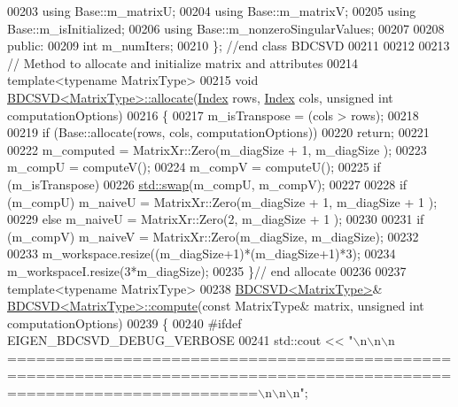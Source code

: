 \begin{DoxyCode}
00203   \textcolor{keyword}{using} Base::m\_matrixU;
00204   \textcolor{keyword}{using} Base::m\_matrixV;
00205   \textcolor{keyword}{using} Base::m\_isInitialized;
00206   \textcolor{keyword}{using} Base::m\_nonzeroSingularValues;
00207 
00208 \textcolor{keyword}{public}:  
00209   \textcolor{keywordtype}{int} m\_numIters;
00210 \}; \textcolor{comment}{//end class BDCSVD}
00211 
00212 
00213 \textcolor{comment}{// Method to allocate and initialize matrix and attributes}
00214 \textcolor{keyword}{template}<\textcolor{keyword}{typename} MatrixType>
00215 \textcolor{keywordtype}{void} \hyperlink{group___s_v_d___module_class_eigen_1_1_b_d_c_s_v_d}{BDCSVD<MatrixType>::allocate}(\hyperlink{namespace_eigen_a62e77e0933482dafde8fe197d9a2cfde}{Index} rows, 
      \hyperlink{namespace_eigen_a62e77e0933482dafde8fe197d9a2cfde}{Index} cols, \textcolor{keywordtype}{unsigned} \textcolor{keywordtype}{int} computationOptions)
00216 \{
00217   m\_isTranspose = (cols > rows);
00218 
00219   \textcolor{keywordflow}{if} (Base::allocate(rows, cols, computationOptions))
00220     \textcolor{keywordflow}{return};
00221   
00222   m\_computed = MatrixXr::Zero(m\_diagSize + 1, m\_diagSize );
00223   m\_compU = computeV();
00224   m\_compV = computeU();
00225   \textcolor{keywordflow}{if} (m\_isTranspose)
00226     \hyperlink{endian_8c_a3ca5ecd34b04d6a243c054ac3a57f68d}{std::swap}(m\_compU, m\_compV);
00227   
00228   \textcolor{keywordflow}{if} (m\_compU) m\_naiveU = MatrixXr::Zero(m\_diagSize + 1, m\_diagSize + 1 );
00229   \textcolor{keywordflow}{else}         m\_naiveU = MatrixXr::Zero(2, m\_diagSize + 1 );
00230   
00231   \textcolor{keywordflow}{if} (m\_compV) m\_naiveV = MatrixXr::Zero(m\_diagSize, m\_diagSize);
00232   
00233   m\_workspace.resize((m\_diagSize+1)*(m\_diagSize+1)*3);
00234   m\_workspaceI.resize(3*m\_diagSize);
00235 \}\textcolor{comment}{// end allocate}
00236 
00237 \textcolor{keyword}{template}<\textcolor{keyword}{typename} MatrixType>
00238 \hyperlink{group___s_v_d___module_class_eigen_1_1_b_d_c_s_v_d}{BDCSVD<MatrixType>}& \hyperlink{group___s_v_d___module_a52e3c627775010775c64d16a00cdb770}{BDCSVD<MatrixType>::compute}(\textcolor{keyword}{const} 
      MatrixType& matrix, \textcolor{keywordtype}{unsigned} \textcolor{keywordtype}{int} computationOptions) 
00239 \{
00240 \textcolor{preprocessor}{#ifdef EIGEN\_BDCSVD\_DEBUG\_VERBOSE}
00241   std::cout << \textcolor{stringliteral}{"\(\backslash\)n\(\backslash\)n\(\backslash\)n
      ======================================================================================================================\(\backslash\)n\(\backslash\)n\(\backslash\)n"};

\end{DoxyCode}
